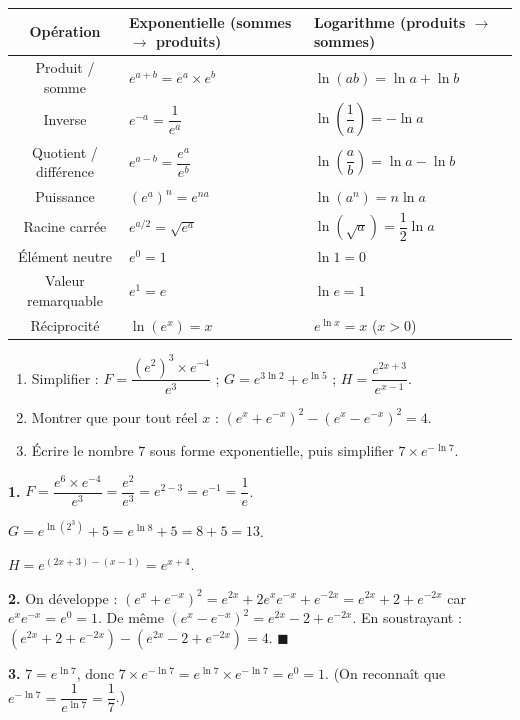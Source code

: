 \documentclass[11pt]{article}
\begin{document}
\begin{center}
\begin{tabularx}{\linewidth}{|c|X|X|}
\hline
\rowcolor{popblueL}
\textbf{Opération} & \textbf{Exponentielle (sommes $\to$ produits)} & \textbf{Logarithme (produits $\to$ sommes)} \\
\hline
Produit / somme & $e^{a+b} = e^a \times e^b$ & $\ln(ab) = \ln a + \ln b$ \\
\hline
Inverse & $e^{-a} = \dfrac{1}{e^a}$ & $\ln\!\left(\dfrac{1}{a}\right) = -\ln a$ \\
\hline
Quotient / différence & $e^{a-b} = \dfrac{e^a}{e^b}$ & $\ln\!\left(\dfrac{a}{b}\right) = \ln a - \ln b$ \\
\hline
Puissance & $(e^a)^n = e^{na}$ & $\ln(a^n) = n \ln a$ \\
\hline
Racine carrée & $e^{a/2} = \sqrt{e^a}$ & $\ln(\sqrt{a}) = \dfrac{1}{2}\ln a$ \\
\hline
Élément neutre & $e^0 = 1$ & $\ln 1 = 0$ \\
\hline
Valeur remarquable & $e^1 = e$ & $\ln e = 1$ \\
\hline
Réciprocité & $\ln(e^x) = x$ & $e^{\ln x} = x$ \; ($x > 0$) \\
\hline
\end{tabularx}
\end{center}

\begin{exercice}
\begin{enumerate}
\item Simplifier : $F = \dfrac{(e^2)^3 \times e^{-4}}{e^{3}}$ ; \quad $G = e^{3\ln 2} + e^{\ln 5}$ ; \quad $H = \dfrac{e^{2x+3}}{e^{x-1}}$.
\item Montrer que pour tout réel $x$ : $\left(e^x + e^{-x}\right)^2 - \left(e^x - e^{-x}\right)^2 = 4$.
\item Écrire le nombre $7$ sous forme exponentielle, puis simplifier $7 \times e^{-\ln 7}$.
\end{enumerate}
\end{exercice}

\begin{corrige}
\textbf{1.} $F = \dfrac{e^{6} \times e^{-4}}{e^{3}} = \dfrac{e^{2}}{e^{3}} = e^{2-3} = e^{-1} = \dfrac{1}{e}$.

$G = e^{\ln(2^3)} + 5 = e^{\ln 8} + 5 = 8 + 5 = 13$.

$H = e^{(2x+3)-(x-1)} = e^{x+4}$.

\textbf{2.} On développe : $\left(e^x + e^{-x}\right)^2 = e^{2x} + 2 e^x e^{-x} + e^{-2x} = e^{2x} + 2 + e^{-2x}$ car $e^x e^{-x} = e^0 = 1$. De même $\left(e^x - e^{-x}\right)^2 = e^{2x} - 2 + e^{-2x}$. En soustrayant : $(e^{2x} + 2 + e^{-2x}) - (e^{2x} - 2 + e^{-2x}) = 4$. $\blacksquare$

\textbf{3.} $7 = e^{\ln 7}$, donc $7 \times e^{-\ln 7} = e^{\ln 7} \times e^{-\ln 7} = e^{0} = 1$. (On reconnaît que $e^{-\ln 7} = \dfrac{1}{e^{\ln 7}} = \dfrac{1}{7}$.)
\end{corrige}
\end{document}
